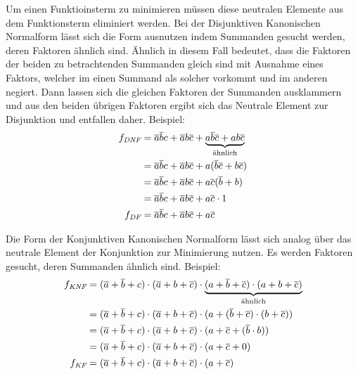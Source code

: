 \documentclass[11pt,a4paper]{scrreprt}
\begin{document}
Um einen Funktioinsterm zu minimieren müssen diese neutralen Elemente aus dem Funktionsterm eliminiert werden. Bei der Disjunktiven Kanonischen Normalform lässt sich die Form ausnutzen indem Summanden gesucht werden, deren Faktoren ähnlich sind. Ähnlich in diesem Fall bedeutet, dass die Faktoren der beiden zu betrachtenden Summanden gleich sind mit Ausnahme eines Faktors, welcher im einen Summand als solcher vorkommt und im anderen negiert. Dann lassen sich die gleichen Faktoren der Summanden ausklammern und aus den beiden übrigen Faktoren ergibt sich das Neutrale Element zur Disjunktion und entfallen daher. Beispiel:
\begin{align*}
	f_{\textit{DNF}} &= \overline{a}\overline{b}c + \overline{a}b\overline{c} 
		+ \underbrace{a\overline{b}\overline{c} + ab\overline{c}}_{\textnormal{ähnlich}} \\
	&= \overline{a}\overline{b}c + \overline{a}b\overline{c} 
		+ a(\overline{b}\overline{c} + b\overline{c}) \\
	&= \overline{a}\overline{b}c + \overline{a}b\overline{c} 
		+ a\overline{c}(\overline{b} + b) \\
	&= \overline{a}\overline{b}c + \overline{a}b\overline{c} 
		+ a\overline{c} \cdot 1 \\
	f_{\textit{DF}} &= \overline{a}\overline{b}c + \overline{a}b\overline{c}
		+ a\overline{c} \\
\end{align*}

Die Form der Konjunktiven Kanonischen Normalform lässt sich analog über das neutrale Element der Konjunktion zur Minimierung nutzen. Es werden Faktoren gesucht, deren Summanden ähnlich sind. Beispiel:
\begin{align*}
	f_{\textit{KNF}} &= (\overline{a} + \overline{b} + c) \cdot (\overline{a} + b + \overline{c}) 
		\cdot \underbrace{(a + \overline{b} + \overline{c}) \cdot (a + b + \overline{c})}_{\textnormal{ähnlich}} \\
	&= (\overline{a} + \overline{b} + c) \cdot (\overline{a} + b + \overline{c}) 
		\cdot (a + (\overline{b} + \overline{c}) \cdot (b + \overline{c})) \\
	&= (\overline{a} + \overline{b} + c) \cdot (\overline{a} + b + \overline{c}) 
		\cdot (a + \overline{c} + (\overline{b} \cdot b)) \\
	&= (\overline{a} + \overline{b} + c) \cdot (\overline{a} + b + \overline{c}) 
		\cdot (a + \overline{c} + 0) \\
	f_{\textit{KF}} &= (\overline{a} + \overline{b} + c) \cdot (\overline{a} + b + \overline{c}) 
		\cdot (a + \overline{c}) \\
\end{align*}
\end{document}
